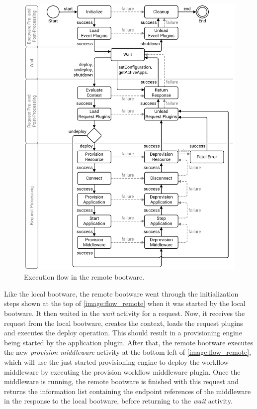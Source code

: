 \begin{figure}[!htbp]
	\centering
	\includegraphics[resolution=600]{design/assets/flow_remote}
	\caption{Execution flow in the remote bootware.}
	\label{image:flow_remote}
\end{figure}

\pagebreak

Like the local bootware, the remote bootware went through the initialization steps shown at the top of \autoref{image:flow_remote} when it was started by the local bootware.
It then waited in the \textit{wait} activity for a request.
Now, it receives the request from the local bootware, creates the context, loads the request plugins and executes the deploy operation.
This should result in a provisioning engine being started by the application plugin.
After that, the remote bootware executes the new \textit{provision middleware} activity at the bottom left of \autoref{image:flow_remote}, which will use the just started provisioning engine to deploy the workflow middleware by executing the provision workflow middleware plugin.
Once the middleware is running, the remote bootware is finished with this request and returns the information list containing the endpoint references of the middleware in the response to the local bootware, before returning to the \textit{wait} activity.

